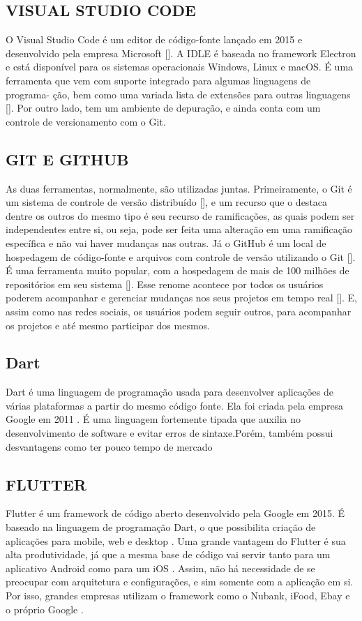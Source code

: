 \documentclass[a4paper,12pt]{article}
\begin{document}
\subsection{VISUAL STUDIO CODE}
O Visual Studio Code é um editor de código-fonte lançado em 2015 e desenvolvido pela
empresa Microsoft []. A IDLE é baseada no framework Electron e está disponível para os
sistemas operacionais Windows, Linux e macOS.
É uma ferramenta que vem com suporte integrado para algumas linguagens de programa-
ção, bem como uma variada lista de extensões para outras linguagens []. Por outro lado, tem
um ambiente de depuração, e ainda conta com um controle de versionamento com o Git.
\subsection{GIT E GITHUB}
As duas ferramentas, normalmente, são utilizadas juntas. Primeiramente, o Git é um
sistema de controle de versão distribuído [], e um recurso que o destaca dentre os outros do
mesmo tipo é seu recurso de ramificações, as quais podem ser independentes entre si, ou seja,
pode ser feita uma alteração em uma ramificação específica e não vai haver mudanças nas outras.
Já o GitHub é um local de hospedagem de código-fonte e arquivos com controle de
versão utilizando o Git []. É uma ferramenta muito popular, com a hospedagem de mais de
100 milhões de repositórios em seu sistema []. Esse renome acontece por todos os usuários
poderem acompanhar e gerenciar mudanças nos seus projetos em tempo real []. E, assim como
nas redes sociais, os usuários podem seguir outros, para acompanhar os projetos e até mesmo
participar dos mesmos.
\subsection{Dart}
Dart é uma linguagem de programação usada para desenvolver aplicações de várias plataformas a partir do mesmo código fonte. Ela foi criada pela empresa Google em 2011 \cite{dart}.
É uma linguagem fortemente tipada que auxilia no desenvolvimento de software e evitar erros de sintaxe.Porém, também possui desvantagens como ter pouco tempo de mercado
\subsection{FLUTTER}
Flutter é um framework de código aberto desenvolvido pela Google em 2015. É baseado
na linguagem de programação Dart, o que possibilita criação de aplicações para mobile, web e
desktop \cite{flutter}.
Uma grande vantagem do Flutter é sua alta produtividade, já que a mesma base de código
vai servir tanto para um aplicativo Android como para um iOS \cite{geekhunter}. Assim, não há necessidade
de se preocupar com arquitetura e configurações, e sim somente com a aplicação em si. Por isso,
grandes empresas utilizam o framework como o Nubank, iFood, Ebay e o próprio Google \cite{geekhunter}.
\end{document}
